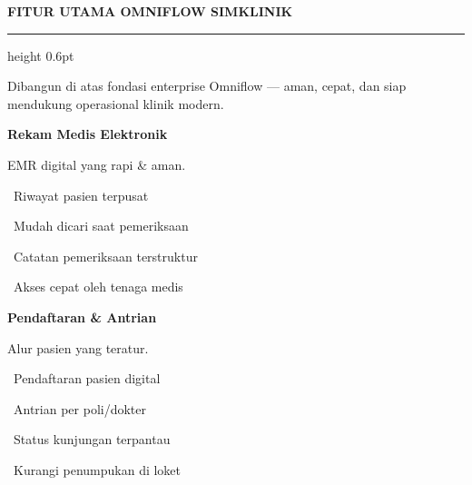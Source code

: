 \documentclass[a4paper]{article}
\newcommand{\sectiontitle}[1]{%
    \vspace{10pt}%
    {\fontsize{13}{16}\selectfont\bfseries\color{BlueDark} #1}\par\vspace{3pt}%
    {\color{BluePrimary}\hrule height 0.6pt}\par\vspace{8pt}%
}
\begin{document}
\sectiontitle{FITUR UTAMA OMNIFLOW SIMKLINIK}

{\fontsize{9.5}{13}\selectfont\color{TextLight} Dibangun di atas fondasi enterprise Omniflow --- aman, cepat, dan siap mendukung operasional klinik modern.}

\vspace{6pt}

\noindent
\begin{minipage}[t]{0.485\textwidth}
    \colorbox{BluePrimary}{%
        \begin{minipage}{\dimexpr\textwidth-2\fboxsep\relax}
            {\fontsize{10}{13}\selectfont\bfseries\color{White} Rekam Medis Elektronik}
        \end{minipage}}\par
    \vspace{4pt}
    {\fontsize{9}{12}\selectfont\color{TextDark}%
    EMR digital yang rapi \& aman.\par\vspace{3pt}
    \textbullet\ Riwayat pasien terpusat\par\vspace{2pt}%
    \textbullet\ Mudah dicari saat pemeriksaan\par\vspace{2pt}%
    \textbullet\ Catatan pemeriksaan terstruktur\par\vspace{2pt}%
    \textbullet\ Akses cepat oleh tenaga medis}%

\end{minipage}%
\hfill
\begin{minipage}[t]{0.485\textwidth}
    \colorbox{EmeraldPrimary}{%
        \begin{minipage}{\dimexpr\textwidth-2\fboxsep\relax}
            {\fontsize{10}{13}\selectfont\bfseries\color{White} Pendaftaran \& Antrian}
        \end{minipage}}\par
    \vspace{4pt}
    {\fontsize{9}{12}\selectfont\color{TextDark}%
    Alur pasien yang teratur.\par\vspace{3pt}
    \textbullet\ Pendaftaran pasien digital\par\vspace{2pt}%
    \textbullet\ Antrian per poli/dokter\par\vspace{2pt}%
    \textbullet\ Status kunjungan terpantau\par\vspace{2pt}%
    \textbullet\ Kurangi penumpukan di loket}%

\end{minipage}
\end{document}
